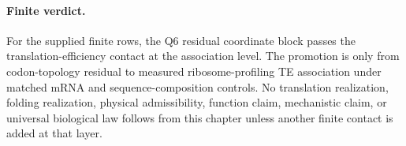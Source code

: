 \paragraph{Finite verdict.}
For the supplied finite rows, the Q6 residual coordinate block passes the translation-efficiency contact at the association level.  The promotion is only from codon-topology residual to measured ribosome-profiling TE association under matched mRNA and sequence-composition controls.  No translation realization, folding realization, physical admissibility, function claim, mechanistic claim, or universal biological law follows from this chapter unless another finite contact is added at that layer.

